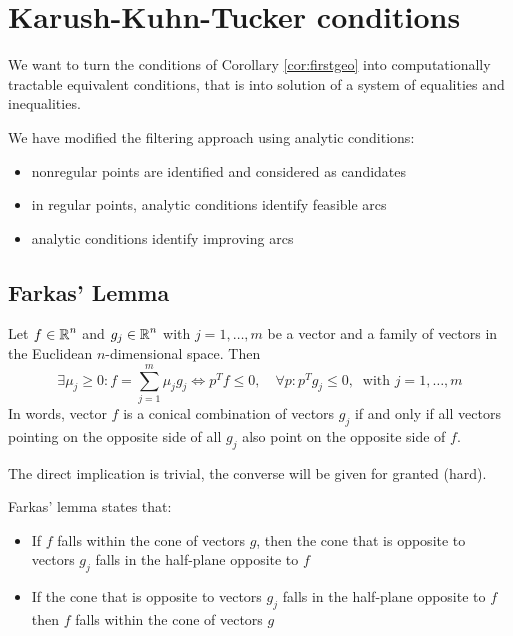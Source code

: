 \section{Karush-Kuhn-Tucker conditions}
\label{sec:kktcond}

We want to turn the conditions of Corollary \ref{cor:firstgeo} into computationally tractable equivalent conditions, that is into solution of a system of equalities and inequalities. 

We have modified the filtering approach using analytic conditions: 
\begin{itemize}
	\item nonregular points are identified and considered as candidates
	
	\item in regular points, analytic conditions identify feasible arcs 
	
	\item analytic conditions identify improving arcs
\end{itemize}

\subsection{Farkas' Lemma}
\label{subsec:farkas}

\begin{theo}
	Let $f \in \operatorname{\mathbb{R}}^n$ and $g_j \in \operatorname{\mathbb{R}}^n$ with $j = 1, \dots, m$ be a vector and a family of vectors in the Euclidean $n$-dimensional space. Then
	$$ \exists \mu_j \geq 0 : f = \sum_{j = 1}^m \mu_j g_j \Leftrightarrow p^T f \leq 0, \quad \forall p : p^T g_j \leq 0, \ \text{ with } j = 1, \dots, m $$
	In words, vector $f$ is a conical combination of vectors $g_j$ if and only if all vectors pointing on the opposite side of all $g_j$ also point on the opposite side of $f$.
\end{theo}

The direct implication is trivial, the converse will be given for granted (hard).

Farkas' lemma states that: 
\begin{itemize}
	\item If $f$ falls within the cone of vectors $g$, then the cone that is opposite to vectors $g_j$ falls in the half-plane opposite to $f$
	
	\item If the cone that is opposite to vectors $g_j$ falls in the half-plane opposite to $f$ then $f$ falls within the cone of vectors $g$
\end{itemize}


